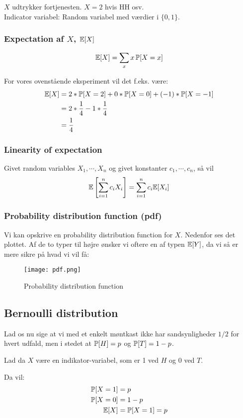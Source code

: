 $X$ udtrykker fortjenesten. $X = 2$ hvis HH osv.\\

Indicator variabel: Random variabel med værdier i $\{0, 1\}$.

\subsubsection{Expectation af $X$, $\e[X]$}
\begin{align} \label{eq:exp-random}
\e[X] = \sum_{x} x \, \P[X = x]
\end{align}

For vores ovenstående eksperiment vil det f.eks. være:
\begin{align*}
\e [X] &= 2 * \P[X = 2] + 0 * \P[X=0] + (-1) * \P[X = -1]\\
       &= 2 * \frac{1}{4} - 1 * \frac{1}{4}\\
       &= \frac{1}{4}
\end{align*}


\subsubsection{Linearity of expectation}
Givet random variables $X_1, \cdots, X_n$ og givet konstanter $c_1, \cdots, c_n$, så vil
\begin{align} \label{eq:linearity}
\e \square{\sum_{i=1}^{n} c_i X_i} = \sum_{i=1}^n c_i \e[X_i]
\end{align}

\subsubsection{Probability distribution function (pdf)}
Vi kan opskrive en probability distribution function for $X$. Nedenfor ses det plottet. Af de to typer til højre ønsker vi oftere en af typen $\e[Y]$, da vi så er mere sikre på hvad vi vil få:
\begin{figure}[H]
	\begin{center}
		\texttt{[image: pdf.png]}
	\end{center}
	\caption{Probability distribution function}
	\label{fig:pdf}
\end{figure}

\subsection{Bernoulli distribution}
Lad os nu sige at vi med et enkelt møntkast ikke har sandsynligheder $1/2$ for hvert udfald, men i stedet at $\P[H] = p$ og $\P[T] = 1-p$.

Lad da $X$ være en indikator-variabel, som er 1 ved $H$ og 0 ved $T$.

Da vil:
\begin{align*}
\P[X = 1] &= p\\
\P[X = 0] &= 1 - p\\
    \e[X] &= \P[X = 1] = p
\end{align*}
